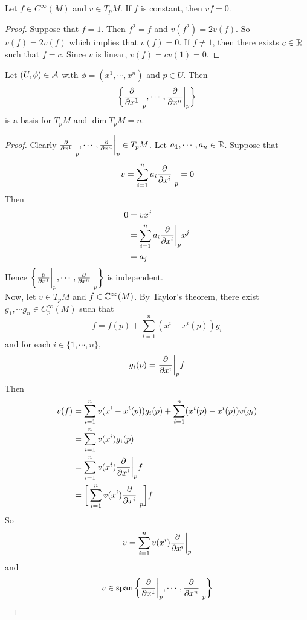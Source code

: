\documentclass{book}
\begin{document}
	\begin{ex}
		Let $f \in C^{\infty}(M)$ and $v \in T_pM$. If $f$ is constant, then $vf = 0$.
	\end{ex}

	\begin{proof}
		Suppose that $f = 1$. Then $f^2 = f$ and $v(f^2) = 2v(f)$. So $v(f) = 2v(f)$ which implies that $v(f) = 0$. If $f \neq 1$, then there exists $c \in \mathbb{R}$ such that $f = c$. Since $v$ is linear, $v(f) = cv(1) = 0$.
	\end{proof}

	\begin{ex}
		Let $(U, \phi) \in \mathcal{A}$ with $\phi = (x^1, \cdots, x^n)$ and $p \in U$. Then $$ \bigg \{\frac{\partial}{\partial x^1} \bigg|_p, \cdots, \frac{\partial}{\partial x^n} \bigg|_p \bigg \}$$ is a basis for $T_pM$ and $\dim T_pM = n$.
	\end{ex}

	\begin{proof}
		Clearly $\frac{\partial}{\partial x^1} \bigg|_p, \cdots, \frac{\partial}{\partial x^n} \bigg|_p \in T_pM$. Let $a_1, \cdots, a_n \in \mathbb{R}$. Suppose that $$v = \sum_{i=1}^n a_i \frac{\partial}{\partial x^i} \bigg |_p  = 0$$
		Then 
		\begin{align*}
			0
			&= v x^j \\
			&= \sum_{i=1}^n a_i \frac{\partial}{\partial x^i} \bigg |_p  x^j \\
			&= a_j
		\end{align*}
		Hence $\bigg \{\frac{\partial}{\partial x^1} \bigg|_p, \cdots, \frac{\partial}{\partial x^n} \bigg|_p \bigg \}$ is independent.\\
		Now, let $v \in T_pM$ and $f \in \mathbb{C}^{\infty}(M)$. By Taylor's theorem, there exist $g_1, \cdots g_n \in C_p^{\infty}(M)$ such that $$f = f(p) + \sum_{i=1}^n(x^i - x^i(p)) g_i$$ and for each $i \in \{1, \cdots, n\}$, $$g_i(p) = \frac{\partial}{\partial x^i} \bigg |_p  f $$ Then 
		\begin{align*}
			v(f)
			&= \sum_{i=1}^nv(x^i - x^i(p)) g_i(p) + \sum_{i=1}^n(x^i(p) - x^i(p)) v(g_i) \\
			&= \sum_{i=1}^nv(x^i)g_i(p) \\
			&= \sum_{i=1}^nv(x^i)\frac{\partial}{\partial x^i} \bigg |_p  f \\
			&= \bigg[ \sum_{i=1}^nv(x^i)\frac{\partial}{\partial x^i} \bigg |_p  \bigg] f
		\end{align*}
		So $$v = \sum_{i=1}^nv(x^i)\frac{\partial}{\partial x^i} \bigg |_p  $$ and $$v \in \operatorname{span} \bigg \{\frac{\partial}{\partial x^1} \bigg|_p, \cdots, \frac{\partial}{\partial x^n} \bigg|_p \bigg \}$$
	\end{proof}
\end{document}
